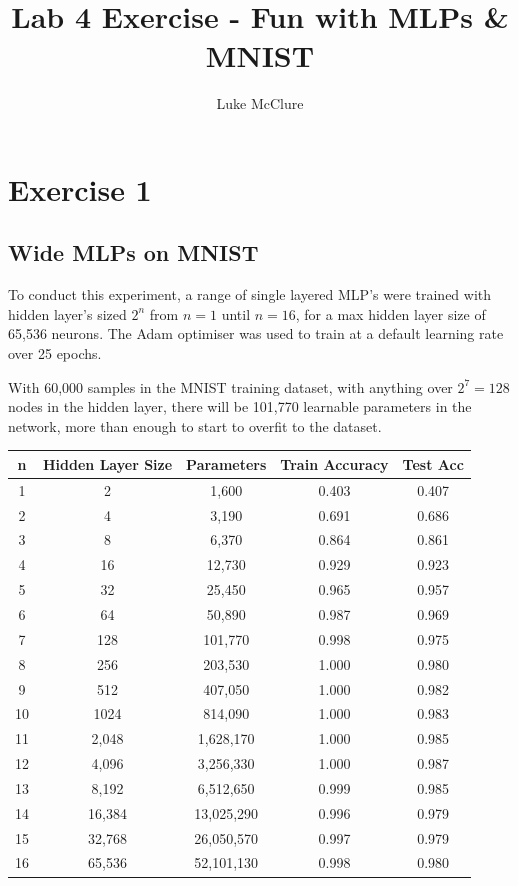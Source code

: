 \documentclass[sigconf]{acmart}
\begin{document}
\title{Lab 4 Exercise - Fun with MLPs \& MNIST}
\author{Luke McClure}

\maketitle

\section{Exercise 1}
\subsection{Wide MLPs on MNIST}

To conduct this experiment, a range of single layered MLP's were trained with hidden layer's sized $2^n$ from $n = 1$ until $n = 16$, for a max hidden layer size of 65,536 neurons.
The Adam optimiser was used to train at a default learning rate over 25 epochs.

With 60,000 samples in the MNIST training dataset, with anything over $2^{7} = 128$ nodes in the hidden layer, there will be 101,770 learnable parameters in the network, more than enough to start to overfit to the dataset.

\begin{table}
    \begin{tabular}{|c c c c c|}
        n & Hidden Layer Size & Parameters & Train Accuracy & Test Acc \\
        \hline
        1 & 2 & 1,600 & 0.403 & 0.407 \\        
        2 & 4 & 3,190 & 0.691 & 0.686 \\
        3 & 8 & 6,370 & 0.864 & 0.861 \\
        4 & 16 & 12,730 & 0.929 & 0.923 \\
        5 & 32 & 25,450 & 0.965 & 0.957 \\
        6 & 64 & 50,890 & 0.987 & 0.969\\
        7 & 128 & 101,770 & 0.998 & 0.975\\
        8 & 256 & 203,530 & 1.000 & 0.980\\
        9 & 512 & 407,050 & 1.000 & 0.982\\
        10 & 1024 & 814,090 & 1.000 & 0.983\\
        11 & 2,048 & 1,628,170 & 1.000 & 0.985\\    
        12 & 4,096 & 3,256,330 & 1.000 & 0.987\\
        13 & 8,192 & 6,512,650 & 0.999 & 0.985\\
        14 & 16,384 & 13,025,290 & 0.996 & 0.979\\
        15 & 32,768 & 26,050,570 & 0.997 & 0.979\\
        16 & 65,536 & 52,101,130 & 0.998 & 0.980\\
    \end{tabular}
\end{table}
\end{document}
